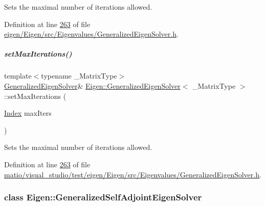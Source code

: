Sets the maximal number of iterations allowed. 

Definition at line \hyperlink{eigen_2_eigen_2src_2_eigenvalues_2_generalized_eigen_solver_8h_source_l00263}{263} of file \hyperlink{eigen_2_eigen_2src_2_eigenvalues_2_generalized_eigen_solver_8h_source}{eigen/\+Eigen/src/\+Eigenvalues/\+Generalized\+Eigen\+Solver.\+h}.

\mbox{\label{group___eigenvalues___module_a2a6f96bd042068cfc0eafba839b424bd}} 
\subparagraph{\texorpdfstring{set\+Max\+Iterations()}{setMaxIterations()}\hspace{0.1cm}{\footnotesize\ttfamily [2/2]}}
{\footnotesize\ttfamily template$<$typename \+\_\+\+Matrix\+Type$>$ \\
\hyperlink{group___eigenvalues___module_class_eigen_1_1_generalized_eigen_solver}{Generalized\+Eigen\+Solver}\& \hyperlink{group___eigenvalues___module_class_eigen_1_1_generalized_eigen_solver}{Eigen\+::\+Generalized\+Eigen\+Solver}$<$ \+\_\+\+Matrix\+Type $>$\+::set\+Max\+Iterations (\begin{DoxyParamCaption}\item[{\hyperlink{group___eigenvalues___module_a46a0ff3841059479ec314e56a5645302}{Index}}]{max\+Iters }\end{DoxyParamCaption})\hspace{0.3cm}{\ttfamily [inline]}}

Sets the maximal number of iterations allowed. 

Definition at line \hyperlink{matio_2visual__studio_2test_2eigen_2_eigen_2src_2_eigenvalues_2_generalized_eigen_solver_8h_source_l00263}{263} of file \hyperlink{matio_2visual__studio_2test_2eigen_2_eigen_2src_2_eigenvalues_2_generalized_eigen_solver_8h_source}{matio/visual\+\_\+studio/test/eigen/\+Eigen/src/\+Eigenvalues/\+Generalized\+Eigen\+Solver.\+h}.

\label{class_eigen_1_1_generalized_self_adjoint_eigen_solver}
\subsubsection{class Eigen\+:\+:Generalized\+Self\+Adjoint\+Eigen\+Solver}
